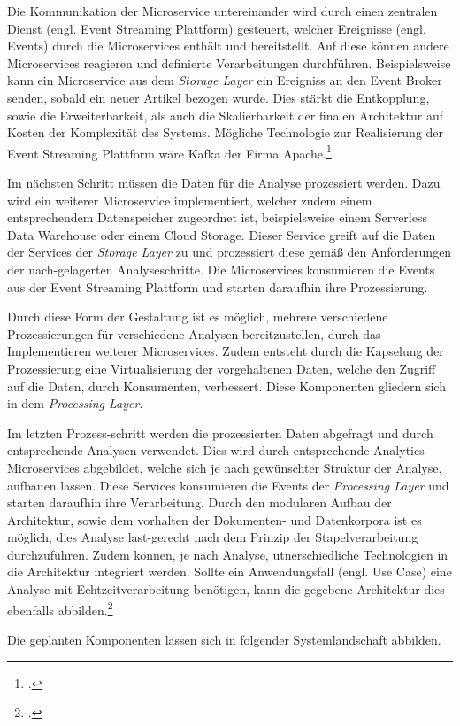 Die Kommunikation der Microservice untereinander wird durch einen zentralen Dienst (engl. Event Streaming Plattform) gesteuert, welcher Ereignisse (engl. Events) durch die Microservices enthält und bereitstellt. Auf diese können andere Microservices reagieren und definierte Verarbeitungen durchführen. Beispielsweise kann ein Microservice aus dem \textit{Storage Layer} ein Ereigniss an den Event Broker senden, sobald ein neuer Artikel bezogen wurde. Dies stärkt die Entkopplung, sowie die Erweiterbarkeit, als auch die Skalierbarkeit der finalen Architektur auf Kosten der Komplexität des Systems.
Mögliche Technologie zur Realisierung der Event Streaming Plattform wäre Kafka der Firma Apache.\footcite[Vgl.][]{Kul.PublishSubscribeMicroservices.2021}{}{}

Im nächsten Schritt müssen die Daten für die Analyse prozessiert werden. Dazu wird ein weiterer Microservice implementiert, welcher zudem einem entsprechendem Datenspeicher zugeordnet ist, beispielsweise einem Serverless Data Warehouse oder einem Cloud Storage. 
Dieser Service greift auf die Daten der Services der \textit{Storage Layer} zu und prozessiert diese gemäß den Anforderungen der nach-gelagerten Analyseschritte. 
Die Microservices konsumieren die Events aus der Event Streaming Plattform und starten daraufhin ihre Prozessierung.

Durch diese Form der Gestaltung ist es möglich, mehrere verschiedene Prozessierungen für verschiedene Analysen bereitzustellen, durch das Implementieren weiterer Microservices. Zudem entsteht durch die Kapselung der Prozessierung eine Virtualisierung der vorgehaltenen Daten, welche den Zugriff auf die Daten, durch Konsumenten, verbessert. Diese Komponenten gliedern sich in dem \textit{Processing Layer}.

Im letzten Prozess-schritt werden die prozessierten Daten abgefragt und durch entsprechende Analysen verwendet. Dies wird durch entsprechende Analytics Microservices abgebildet, welche sich je nach gewünschter Struktur der Analyse, aufbauen lassen. Diese Services konsumieren die Events der \textit{Processing Layer} und starten daraufhin ihre Verarbeitung. Durch den modularen Aufbau der Architektur, sowie dem vorhalten der Dokumenten- und Datenkorpora ist es möglich, dies Analyse last-gerecht nach dem Prinzip der Stapelverarbeitung durchzuführen.
Zudem können, je nach Analyse, utnerschiedliche Technologien in die Architektur integriert werden.
Sollte ein Anwendungsfall (engl. Use Case) eine Analyse mit Echtzeitverarbeitung benötigen, kann die gegebene Architektur dies ebenfalls abbilden.\footcite[Vgl.][]{Hsu.MicroserviceAnalyticsPlattform.2018}{}{}

Die geplanten Komponenten lassen sich in folgender Systemlandschaft abbilden.

